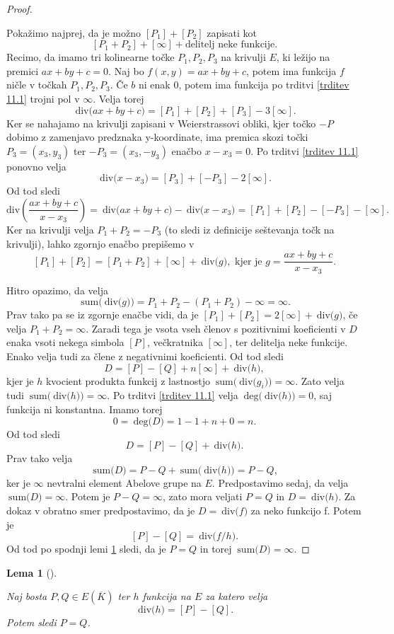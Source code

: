 \documentclass[12pt,a4paper,twoside]{article}
\theoremstyle{definition} %
\theoremstyle{plain} %
\newtheorem{lema}[definicija]{Lema}
\numberwithin{equation}{section}  %
\newcommand{\E}[1]{E({#1})}
\newcommand{\DEG}[1]{\ \text{deg(}{#1}\text{)}}
\newcommand{\Div}[1]{\ \text{div(}{#1}\text{)}}
\newcommand{\SUM}[1]{\ \text{sum(}{#1}\text{)}}
\begin{document}
\begin{proof}~

Pokažimo najprej, da je možno $[P_1]+ [P_2]$ zapisati kot $$[P_1+P_2] + [\infty] + \text{delitelj neke funkcije}.$$
Recimo, da imamo tri kolinearne točke $P_1,P_2,P_3$ na krivulji $E$, ki ležijo na premici $ax+by+c = 0$.
Naj bo $f(x,y) = ax+by+c$, potem ima funkcija $f$ ničle v točkah $P_1,P_2,P_3$. Če $b$ ni enak $0$, potem ima funkcija po trditvi \ref{trditev 11.1} trojni pol v $\infty$.
Velja torej $$\Div{ax+by+c} = [P_1]+[P_2]+[P_3]-3[\infty].$$
Ker se nahajamo na krivulji zapisani v Weierstrassovi obliki, kjer točko $-P$ dobimo z zamenjavo predznaka y-koordinate, ima premica skozi točki $P_3 = (x_3,y_3)$ ter $-P_3=(x_3,-y_3)$ enačbo $x-x_3=0$.
Po  trditvi \ref{trditev 11.1} ponovno velja
$$\Div{x-x_3} = [P_3]+[-P_3]-2[\infty].$$
Od tod sledi
$$\text{div}\left( \frac{ax+by+c}{x-x_3}\right) = \Div{ax+by+c} - \Div{x-x_3} =[P_1]+[P_2]-[-P_3]-[\infty].$$
Ker na krivulji velja $P_1+P_2 = -P_3$ (to sledi iz definicije seštevanja točk na krivulji), lahko zgornjo enačbo prepišemo v 
$$[P_1]+[P_2] = [P_1+P_2]+[\infty]+\Div{g}, \text{ kjer je } g=\frac{ax+by+c}{x-x_3}.$$ 


Hitro opazimo, da velja
$$\SUM{\Div{g}}= P_1+P_2-(P_1+P_2)-\infty = \infty.$$
Prav tako pa se iz zgornje enačbe vidi, da je $[P_1]+[P_2] = 2[\infty] + \Div{g}$, če velja $P_1+P_2 = \infty$. Zaradi tega je vsota vseh členov s pozitivnimi koeficienti v $D$ enaka vsoti nekega simbola $[P]$, večkratnika $[\infty]$, ter delitelja neke funkcije. Enako velja tudi za člene z negativnimi koeficienti. Od tod sledi
$$D = [P]-[Q]+n[\infty]+\Div{h},$$
kjer je $h$ kvocient produkta funkcij z lastnostjo $\SUM{\Div{g_i}} = \infty$. Zato velja tudi
\newline $\SUM{\Div{h}}= \infty$. Po trditvi \ref{trditev 11.1} velja $\DEG{\Div{h}}=0$, saj funkcija ni konstantna. Imamo torej $$0 = \DEG{D} = 1-1+n+0=n.$$
Od tod sledi
$$D = [P]-[Q] + \Div{h}.$$
Prav tako velja
$$\SUM{D} = P-Q+\SUM{\Div{h}} = P-Q,$$
ker je $\infty$ nevtralni element Abelove grupe na $E$.
Predpostavimo sedaj, da velja $\SUM{D} = \infty$. Potem je $P-Q = \infty$, zato mora veljati $P=Q$ in $D = \Div{h}$. Za dokaz v obratno smer predpostavimo, da je $D = \Div{f}$ za neko funkcijo f. Potem je
$$[P]-[Q] = \Div{f/h}.$$
Od tod po spodnji lemi \ref{lema 11.3} sledi, da je $P = Q$ in torej $\SUM{D} = \infty$.

\end{proof}

\begin{lema}[]~

\label{lema 11.3}

Naj bosta $P,Q \in \E{\overline{K}}$ ter $h$ funkcija na $E$ za katero velja
$$\Div{h}=[P]-[Q].$$
Potem sledi $P=Q$.
\end{lema}
\newpage
\end{document}
